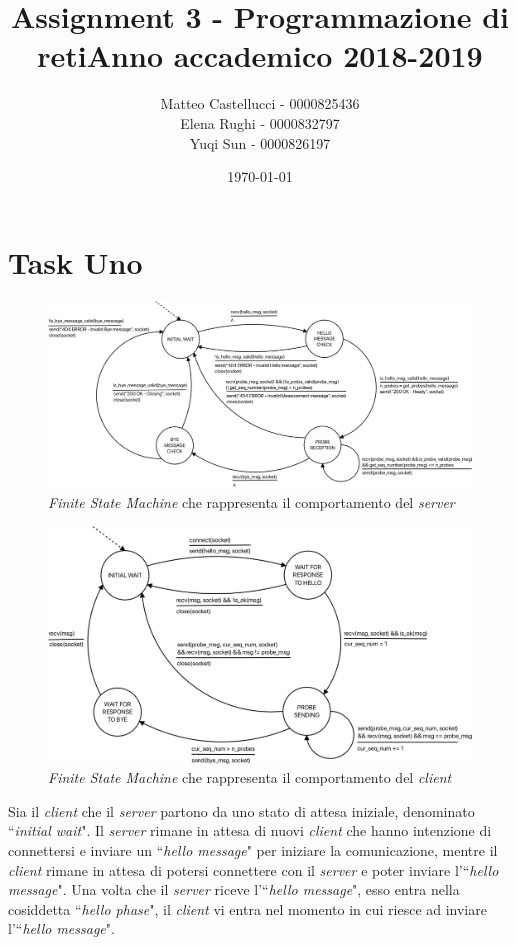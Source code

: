 \documentclass[a4paper, 12pt]{report}
\title{Assignment 3 - Programmazione di reti\newline Anno accademico 2018-2019}
\date{\today}
\author{Matteo Castellucci - 0000825436\\Elena Rughi - 0000832797\\Yuqi Sun - 0000826197\newline}
\begin{document}
\maketitle
\tableofcontents

\chapter{Task Uno}

\begin{figure}[H]
	\centering
	\includegraphics[width=\linewidth]{images/fsm_server.png}
	\caption{\textit{Finite State Machine} che rappresenta il comportamento del \textit{server}}
\end{figure}

\begin{figure}[H]
	\centering
	\includegraphics[width=\linewidth]{images/fsm_client.png}
	\caption{\textit{Finite State Machine} che rappresenta il comportamento del \textit{client}}
\end{figure}

Sia il \textit{client} che il \textit{server} partono da uno stato di attesa iniziale, denominato ``\textit{initial wait}". Il \textit{server}
rimane in attesa di nuovi \textit{client} che hanno intenzione di connettersi e inviare un ``\textit{hello message}" per iniziare la comunicazione,
mentre il \textit{client} rimane in attesa di potersi connettere con il \textit{server} e poter inviare l'``\textit{hello message}".\newline
Una volta che il \textit{server} riceve l'``\textit{hello message}", esso entra nella cosiddetta ``\textit{hello phase}", il
\textit{client} vi entra nel momento in cui riesce ad inviare l'``\textit{hello message}".
\end{document}
